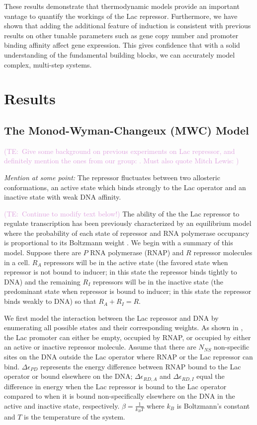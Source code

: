\documentclass[10pt,letterpaper]{article}
\newcommand{\talComment}[1]{\textcolor{Plum}{(TE:~#1)}}
\begin{document}
These results demonstrate that thermodynamic models provide an important vantage
to quantify the workings of the Lac repressor. Furthermore, we have shown that
adding the additional feature of induction is consistent with previous results
on other tunable parameters such as gene copy number and promoter binding
affinity affect gene expression. This gives confidence that with a solid
understanding of the fundamental building blocks, we can accurately model
complex, multi-step systems.


\section*{Results}

\subsection*{The Monod-Wyman-Changeux (MWC) Model} 

\talComment{Give some background on previous experiments on Lac repressor, and definitely mention the ones from our group: \cite{Garcia2011, Brewster2014, Weinert2014}. Must also quote Mitch Lewis: \cite{Daber2011a, Daber2009}}

\textit{Mention at some point:} The repressor fluctuates between two
allosteric conformations, an active state which binds strongly to the Lac
operator and an inactive state with weak DNA affinity.

\talComment{Continue to modify text below!} The ability of the the Lac repressor
to regulate transcription has been previously characterized by an equilibrium
model where the probability of each state of repressor and RNA polymerase
occupancy is proportional to its Boltzmann weight \cite{Daber2011a,
	Phillips2015a}. We begin with a summary of this model. Suppose there are \(P\)
RNA polymerase (RNAP) and \(R\) repressor molecules in a cell. \(R_A\)
repressors will be in the active state (the favored state when repressor is not
bound to inducer; in this state the repressor binds tightly to DNA) and the
remaining \(R_I\) repressors will be in the inactive state (the predominant
state when repressor is bound to inducer; in this state the repressor binds
weakly to DNA) so that \(R_A+R_I=R\).

We first model the interaction between the Lac repressor and DNA by enumerating
all possible states and their corresponding weights. As shown in
\fref[figpolymeraseRepressorStates], the Lac promoter can either be empty,
occupied by RNAP, or occupied by either an active or inactive repressor
molecule. Assume that there are $N_{NS}$ non-specific sites on the DNA outside
the Lac operator where RNAP or the Lac repressor can bind. \(\Delta\epsilon_{PD}\)
represents the energy difference between RNAP bound to the Lac operator or bound
elsewhere on the DNA; \(\Delta\epsilon _{RD,A}\) and \(\Delta\epsilon _{RD,I}\) equal the
difference in energy when the Lac repressor is bound to the Lac operator
compared to when it is bound non-specifically elsewhere on the DNA in the active
and inactive state, respectively. $\beta = \frac{1}{k_BT}$ where $k_B$ is
Boltzmann's constant and $T$ is the temperature of the system.
\end{document}
